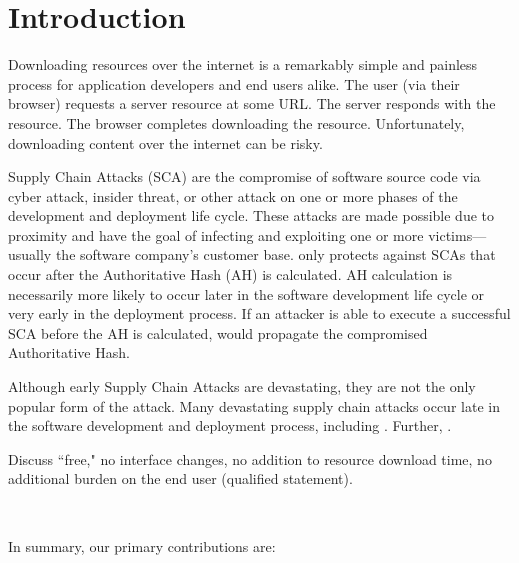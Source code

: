 \section{Introduction} \label{sec:introduction}

Downloading resources over the internet is a remarkably simple and painless
process for application developers and end users alike. The user (via their
browser) requests a server resource at some URL. The server responds with the
resource. The browser completes downloading the resource. Unfortunately,
downloading content over the internet can be risky.

Supply Chain Attacks (SCA) are the compromise of software source code via cyber
attack, insider threat, or other attack on one or more phases of the development
and deployment life cycle. These attacks are made possible due to proximity and
have the goal of infecting and exploiting one or more victims---usually the
software company's customer base. \SYSTEM{} only protects against SCAs that
occur after the Authoritative Hash (AH) is calculated. AH calculation is
necessarily more likely to occur later in the software development life cycle or
very early in the deployment process. If an attacker is able to execute a
successful SCA before the AH is calculated, \SYSTEM{} would propagate the
compromised Authoritative Hash.

Although early Supply Chain Attacks are devastating, they are not the only
popular form of the attack. Many devastating supply chain attacks occur late in
the software development and deployment process, including . Further, .

Discuss ``free," \ie no interface changes, no addition to resource download
time, no additional burden on the end user (qualified statement).

~\cite{DNSSEC}

In summary, our primary contributions are:

